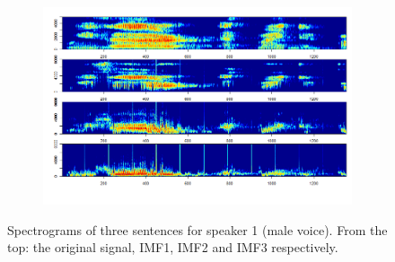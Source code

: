 \documentclass[11pt, a4paper]{article} %
\begin{document}
\begin{landscape}
\begin{figure}
\begin{subfigure}{0.8\textwidth}
  \centering
  \includegraphics[width=\linewidth]{spectro_speak3_tris.png}
  \label{fig:sfig2}
\end{subfigure}
\label{fig1}
\caption{Spectrograms of three sentences for speaker 1 (male voice). From the top: the original signal, IMF1, IMF2 and IMF3 respectively.}
\end{figure}
\end{landscape}
\end{document}

